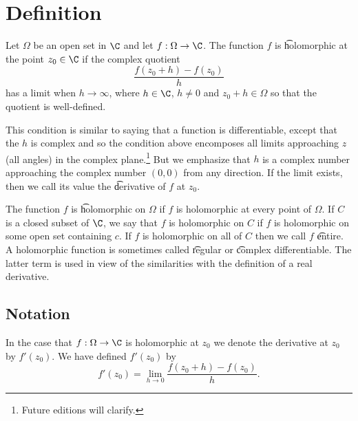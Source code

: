 

\section*{Definition}

Let $\Omega $ be an open set in $\C $ and let $f: \Omega  \to \C $.
The function $f$ is \t{holomorphic at the point} $z_0 \in \C $ if the complex quotient
\[
\frac{f(z_0 + h) - f(z_0)}{h}
\]
has a limit when $h \to \infty$, where $h \in \C $, $h \not= 0$ and $z_0 + h \in \Omega $ so that the quotient is well-defined.

This condition is similar to saying that a function is differentiable, except that the $h$ is complex and so the condition above encomposes all limits approaching $z$ (all angles) in the complex plane.\footnote{Future editions will clarify.}
But we emphasize that $h$ is a complex number approaching the complex number $(0, 0)$ from any direction.
If the limit exists, then we call its value the \t{derivative of $f$ at $z_0$}.

The function $f$ is \t{holomorphic} on $\Omega $ if $f$ is holomorphic at every point of $\Omega $.
If $C$ is a closed subset of $\C $, we say that $f$ is holomorphic on $C$ if $f$ is holomorphic on some open set containing $c$.
If $f$ is holomorphic on all of $C$ then we call $f$ \t{entire}.
A holomorphic function is sometimes called \t{regular} or \t{complex differentiable}.
The latter term is used in view of the similarities with the definition of a real derivative.

\subsection*{Notation}

In the case that $f: \Omega  \to \C $ is holomorphic at $z_0$ we denote the derivative at $z_0$ by $f'(z_0)$.
We have defined $f'(z_0)$ by
\[
f'(z_0) = \lim_{h \to 0} \frac{f(z_0 + h) - f(z_0)}{h}.
\]

\blankpage